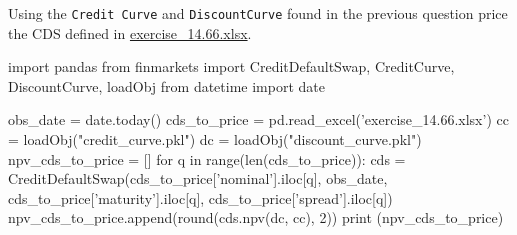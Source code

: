 \cprotEnv\begin{question}
Using the \texttt{Credit\ Curve} and \texttt{DiscountCurve} found in the previous question price the CDS defined in \href{https://github.com/matteosan1/finance_course/raw/master/input_files/exercise_14.66.xlsx}{exercise\_14.66.xlsx}.
\end{question}

\cprotEnv\begin{solution}
\begin{ipython}
import pandas
from finmarkets import CreditDefaultSwap, CreditCurve, DiscountCurve, loadObj
from datetime import date

obs_date = date.today()
cds_to_price = pd.read_excel('exercise_14.66.xlsx')
cc = loadObj("credit_curve.pkl")
dc = loadObj("discount_curve.pkl")
npv_cds_to_price = []
for q in range(len(cds_to_price)):
    cds = CreditDefaultSwap(cds_to_price['nominal'].iloc[q], 
                            obs_date,
                            cds_to_price['maturity'].iloc[q], 
                            cds_to_price['spread'].iloc[q])
    npv_cds_to_price.append(round(cds.npv(dc, cc), 2))
print (npv_cds_to_price)
\end{ipython}
\begin{ioutput}
[-116830.83, -137319.91, -158270.54, 
-162685.25, -217167.88, -238611.07, 
-313501.27, -326567.29, -298467.30]
\end{ioutput}
\end{solution}

